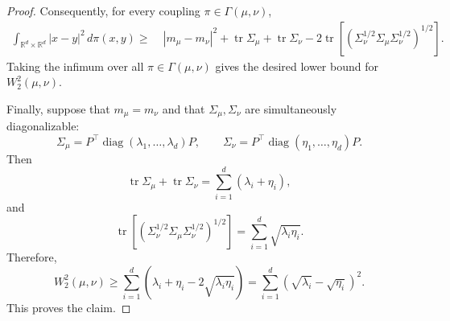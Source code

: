 \documentclass[10pt,a4paper]{amsart}
\newcommand{\bbr}{\mathbb R}
\newcommand{\dm}{d}
\begin{document}
\begin{proof}
Consequently, for every coupling $\pi\in\Gamma(\mu,\nu)$,
\[
\begin{aligned}
\int_{\mathbb R^{d}\times\bbr^\dm} |x-y|^2\,d\pi(x,y)
\ge\;&
|m_\mu-m_\nu|^2
+
\operatorname{tr}\Sigma_\mu
+
\operatorname{tr}\Sigma_\nu
-
2\operatorname{tr}
\left[
\left(
\Sigma_\nu^{1/2}\Sigma_\mu\Sigma_\nu^{1/2}
\right)^{1/2}
\right].
\end{aligned}
\]
Taking the infimum over all $\pi\in\Gamma(\mu,\nu)$ gives the desired lower
bound for $W_2^2(\mu,\nu)$.

Finally, suppose that $m_\mu=m_\nu$ and that $\Sigma_\mu,\Sigma_\nu$ are
simultaneously diagonalizable:
\[
\Sigma_\mu=P^\top\operatorname{diag}(\lambda_1,\dots,\lambda_d)P,
\qquad
\Sigma_\nu=P^\top\operatorname{diag}(\eta_1,\dots,\eta_d)P.
\]
Then
\[
\operatorname{tr}\Sigma_\mu+\operatorname{tr}\Sigma_\nu
=
\sum_{i=1}^d(\lambda_i+\eta_i),
\]
and
\[
\operatorname{tr}
\left[
\left(
\Sigma_\nu^{1/2}\Sigma_\mu\Sigma_\nu^{1/2}
\right)^{1/2}
\right]
=
\sum_{i=1}^d\sqrt{\lambda_i\eta_i}.
\]
Therefore,
\[
W_2^2(\mu,\nu)
\ge
\sum_{i=1}^d
\left(
\lambda_i+\eta_i-2\sqrt{\lambda_i\eta_i}
\right)
=
\sum_{i=1}^d
\left(\sqrt{\lambda_i}-\sqrt{\eta_i}\right)^2.
\]
This proves the claim.
\end{proof}
\end{document}
